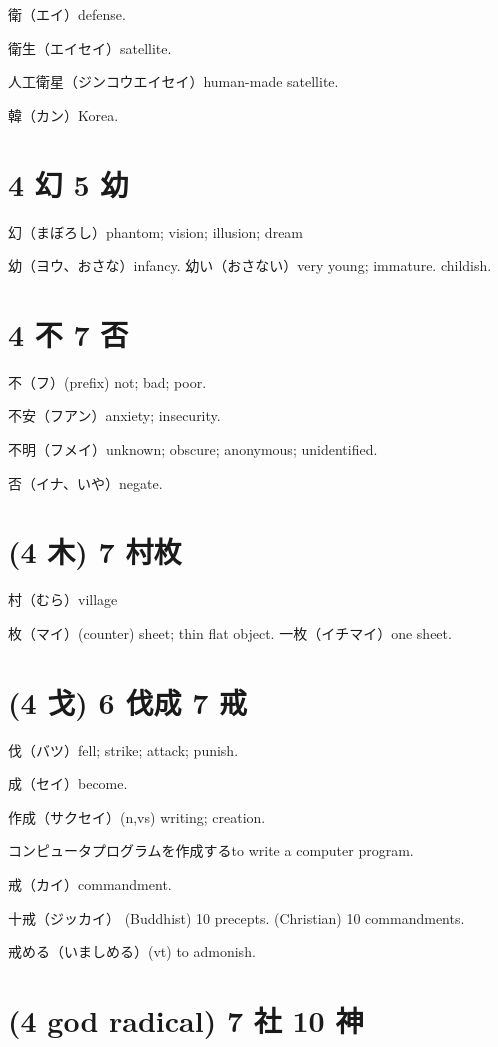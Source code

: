衛（エイ）defense.

衛生（エイセイ）satellite.

人工衛星（ジンコウエイセイ）human-made satellite.

韓（カン）Korea.

\section{4 幻 5 幼}

幻（まぼろし）phantom; vision; illusion; dream

幼（ヨウ、おさな）infancy.
幼い（おさない）very young; immature. childish.

\section{4 不 7 否}

不（フ）(prefix) not; bad; poor.

不安（フアン）anxiety; insecurity.

不明（フメイ）unknown; obscure; anonymous; unidentified.

否（イナ、いや）negate.

\section{(4 木) 7 村枚}

村（むら）village

枚（マイ）(counter) sheet; thin flat object.
一枚（イチマイ）one sheet.

\section{(4 戈) 6 伐成 7 戒}

伐（バツ）fell; strike; attack; punish.

成（セイ）become.

作成（サクセイ）(n,vs) writing; creation.

コンピュータプログラムを作成するto write a computer program.

戒（カイ）commandment.

十戒（ジッカイ）
(Buddhist) 10 precepts.
(Christian) 10 commandments.

戒める（いましめる）(vt) to admonish.

\section{(4 god radical) 7 社 10 神}

